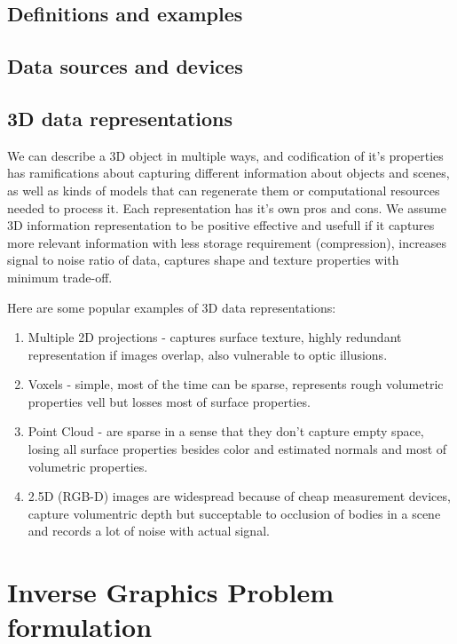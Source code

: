 \subsection{Definitions and examples}
\subsection{Data sources and devices}
\subsection{3D data representations}

We can describe a 3D object in multiple ways, and codification of it's properties has ramifications about capturing different information about objects and scenes, as well as kinds of models that can regenerate them or computational resources needed to process it.
Each representation has it's own pros and cons. We assume 3D information representation to be positive effective and usefull if it captures more relevant information with less storage requirement (compression), increases signal to noise ratio of data, captures shape and texture properties with minimum trade-off.

Here are some popular examples of 3D data representations:
\begin{enumerate}
	\item Multiple 2D projections - captures surface texture, highly redundant representation if images overlap, also vulnerable to optic illusions.
	\item Voxels - simple, most of the time can be sparse, represents rough volumetric properties vell but losses most of surface properties.
	\item Point Cloud - are sparse in a sense that they don't capture empty space, losing all surface properties besides color and estimated normals and most of volumetric properties.
	\item 2.5D (RGB-D) images are widespread because of cheap measurement devices, capture volumentric depth but succeptable to occlusion of bodies in a scene and records a lot of noise with actual signal.
\end{enumerate}


\section{Inverse Graphics Problem formulation}

\cite{rezende2016unsupervised,eslami2016attend,kulkarni2015deep,wu20153d,2016arXiv160805137I}


